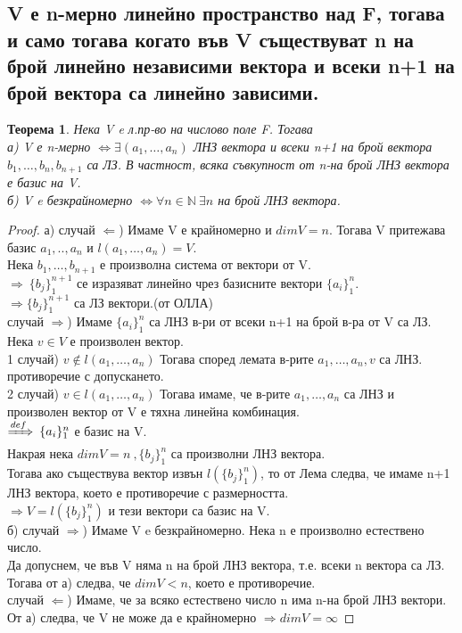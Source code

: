 \documentclass[fleqn,12pt]{article}
\newtheorem*{Th}{Теорема}
\begin{document}
\begin{justify}
\subsection{V е n-мерно линейно пространство над F, тогава и само тогава когато във V съществуват n на
брой линейно независими вектора и всеки n+1 на брой вектора са линейно зависими.}
\begin{Th}
    Нека V e л.пр-во на числово поле F. Тогава\\
    а) V е n-мерно $\iff \exists(a_1,\dots,a_n)$ ЛНЗ вектора и всеки n+1 на брой вектора
    $b_1,\dots,b_n,b_{n+1}$ са ЛЗ. В частност, всяка съвкупност от n-на брой ЛНЗ вектора е базис на
    V.\\
    б) V e безкрайномерно $\iff \forall n \in \mathbb{N} \: \exists n$ на брой ЛНЗ вектора.
\end{Th}
\begin{proof}
    а) случай $\Leftarrow$) Имаме V е крайномерно и $dimV=n$. Тогава V притежава базис $a_1,..,a_n$
    и $l(a_1,\dots,a_n)=V$.\\
    Нека $b_1,\dots,b_{n+1}$ е произволна система от вектори от V.\\
    $\Rightarrow \: \{b_j\}_1^{n+1}$ се изразяват линейно чрез базисните вектори $\{a_i\}_1^n$.\\
    $\Rightarrow \{b_j\}_1^{n+1}$ са ЛЗ вектори.(от ОЛЛА)\\
    случай $\Rightarrow$) Имаме $\{a_i\}_1^n$ са ЛНЗ в-ри от всеки n+1 на брой в-ра от V са ЛЗ. Нека
    $v \in V$ е произволен вектор.\\
    1 случай) $v \notin l(a_1,\dots,a_n)$ Тогава според лемата в-рите ${a_1,\dots,a_n,v}$ са ЛНЗ.
    противоречие с допускането.\\
    2 случай) $v \in l(a_1,\dots,a_n)$ Тогава имаме, че в-рите $a_1,\dots,a_n$ са ЛНЗ и произволен
    вектор от V е тяхна линейна комбинация.\\
    $\xRightarrow{def} \: \{a_i\}_1^n$ е базис на V.\\
    Накрая нека $dimV=n \:, \{b_j\}_1^n$ са произволни ЛНЗ вектора.\\
    Тогава ако съществува вектор извън $l(\{b_j\}_1^n)$, то от Лема следва, че имаме n+1 ЛНЗ
    вектора, което е противоречие с размерността.\\
    $\Rightarrow V=l(\{b_j\}_1^n)$ и тези вектори са базис на V.\\
    б) случай $\Rightarrow$) Имаме V e безкрайномерно. Нека n е произволно естествено число.\\
    Да допуснем, че във V няма n на брой ЛНЗ вектора, т.е. всеки n вектора са ЛЗ. Тогава от а)
    следва, че $dimV < n$, което е противоречие.\\
    случай $\Leftarrow$) Имаме, че за всяко естествено число n има n-на брой ЛНЗ вектори. От а)
    следва, че V не може да е крайномерно $\Rightarrow dimV=\infty$ 
\end{proof}
    

\end{justify}
\end{document}
